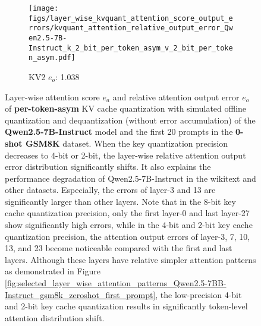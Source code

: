 \begin{figure}
\begin{subfigure}{0.25\columnwidth}
    \texttt{[image: figs/layer\_wise\_kvquant\_attention\_score\_output\_errors/kvquant\_attention\_relative\_output\_error\_Qwen2.5-7B-Instruct\_k\_2\_bit\_per\_token\_asym\_v\_2\_bit\_per\_token\_asym.pdf]}
    \caption{KV2 $e_o$: 1.038}
    \label{fig:kvcache_simulated_quant_error_layer_wise_k2v2_per_token_asym_Qwen2.5-7B-Instruct}
    \end{subfigure}
    \caption{Layer-wise attention score $e_a$ and relative attention output error $e_o$ of \textbf{per-token-asym} KV cache quantization with simulated offline quantization and dequantization (without error accumulation) of the \textbf{Qwen2.5-7B-Instruct} model and the first 20 prompts in the \textbf{0-shot GSM8K} dataset. When the key quantization precision decreases to 4-bit or 2-bit, the layer-wise relative attention output error distribution significantly shifts. It also explains the performance degradation of Qwen2.5-7B-Instruct in the wikitext and other datasets. Especially, the errors of layer-3 and 13 are significantly larger than other layers. Note that in the 8-bit key cache quantization precision, only the first layer-0 and last layer-27 show significantly high errors, while in the 4-bit and 2-bit key cache quantization precision, the attention output errors of layer-3, 7, 10, 13, and 23 become noticeable compared with the first and last layers. Although these layers have relative simpler attention patterns as demonstrated in Figure \ref{fig:selected_layer_wise_attention_patterns_Qwen2.5-7BB-Instruct_gsm8k_zeroshot_first_prompt}, the low-precision 4-bit and 2-bit key cache quantization results in significantly token-level attention distribution shift.}
\label{fig:kvcache_simulated_quant_attention_score_relative_output_error_layer_wise_per_token_asym_qwen2.5_7b}
\end{figure}

